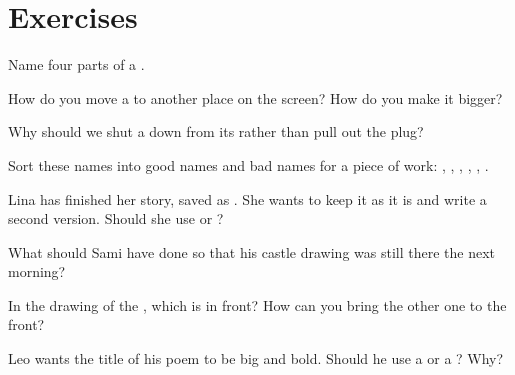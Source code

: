 \section{Exercises}

\begin{exercise}[$\star$]\label{exo:g2:using-a-computer:1}
Name four parts of a .
\end{exercise}

\begin{exercise}[$\star$]\label{exo:g2:using-a-computer:2}
How do you move a  to another place on the screen? How do you make it
bigger?
\end{exercise}

\begin{exercise}[$\star$]\label{exo:g2:using-a-computer:3}
Why should we shut a  down from its  rather than pull out the
plug?
\end{exercise}

\begin{exercise}[$\star$]\label{exo:g2:using-a-computer:4}
Sort these names into good names and bad names for a piece of work:
, , , ,
, .
\end{exercise}

\begin{exercise}[$\star$]\label{exo:g2:using-a-computer:5}
Lina has finished her story, saved as . She wants to keep it as
it is and write a second version. Should she use  or
?
\end{exercise}

\begin{exercise}[$\star$]\label{exo:g2:using-a-computer:6}
What should Sami have done so that his castle drawing was still there the next
morning?
\end{exercise}

\begin{exercise}[$\star$]\label{exo:g2:using-a-computer:7}
In the drawing of the , which  is in front? How can you bring the
other one to the front?
\end{exercise}

\begin{exercise}[$\star$]\label{exo:g2:using-a-computer:8}
Leo wants the title of his poem to be big and bold. Should he use a  or a ? Why?
\end{exercise}

